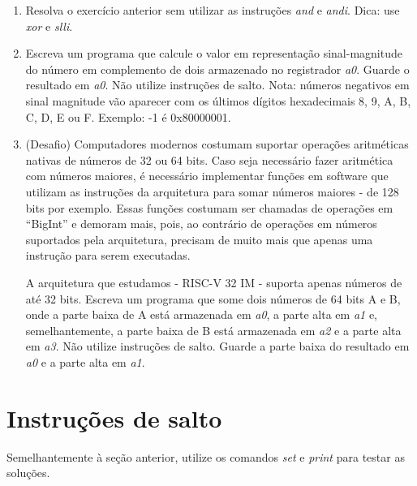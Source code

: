 \documentclass{article}
\begin{document}
\begin{enumerate}
	\item Resolva o exercício anterior sem utilizar as instruções \textit{and} e
	\textit{andi}. Dica: use \textit{xor} e \textit{slli}.

	\item Escreva um programa que calcule o valor em representação sinal-magnitude
	do número em complemento de dois armazenado no registrador \textit{a0}. Guarde
	o resultado em \textit{a0}. Não utilize instruções de salto. Nota: números
	negativos em sinal magnitude vão aparecer com os últimos dígitos hexadecimais
	8, 9, A, B, C, D, E ou F. Exemplo: -1 é 0x80000001.

	\item (Desafio) Computadores modernos costumam suportar operações aritméticas
	nativas de números de 32 ou 64 bits. Caso seja necessário fazer aritmética com
	números maiores, é necessário implementar funções em software que utilizam as
	instruções da arquitetura para somar números maiores - de 128 bits por
	exemplo. Essas funções costumam ser chamadas de operações em ``BigInt'' e
	demoram mais, pois, ao contrário de operações em números suportados pela
	arquitetura, precisam de muito mais que apenas uma instrução para serem
	executadas.

	A arquitetura que estudamos - RISC-V 32 IM - suporta apenas números de até 32
	bits. Escreva um programa que some dois números de 64 bits A e B, onde a parte
	baixa de A está armazenada em \textit{a0}, a parte alta em \textit{a1} e,
	semelhantemente, a parte baixa de B está armazenada em \textit{a2} e a parte
	alta em \textit{a3}. Não utilize instruções de salto. Guarde a parte baixa do
	resultado em \textit{a0} e a parte alta em \textit{a1}.
\end{enumerate}

\section{Instruções de salto}

Semelhantemente à seção anterior, utilize os comandos \textit{set} e
\textit{print} para testar as soluções.
\end{document}
